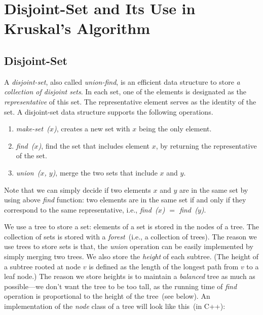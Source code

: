 \section{Disjoint-Set and Its Use in Kruskal's Algorithm}

\subsection*{Disjoint-Set}

A \emph{disjoint-set}, also called \emph{union-find},
is an efficient data structure to store \emph{a collection of disjoint sets}.
In each set, one of the elements is designated as the \emph{representative}
of this set. The representative element serves
as the identity of the set. 
A disjoint-set data structure supports the following operations.
\vspace*{-\topsep}
\begin{enumerate}
\item \emph{make-set~($x$)}, creates a new set with $x$ being the only element.
\item \emph{find~($x$)}, find the set that includes element $x$, by returning the representative of the set.
\item \emph{union~($x$, $y$)}, merge the two sets that include $x$ and $y$.
\end{enumerate}

Note that we can simply decide if two elements $x$ and $y$ are in the same set
by using above \emph{find} function: two elements are in the same set
if and only if they correspond to the same representative, i.e., \emph{find~($x$) $=$ find~($y$)}.

We use a tree to store a set: elements of a set is stored in the nodes of a tree.
The collection of sets is stored with a \emph{forest}~(i.e., a collection of trees).
The reason we use trees to store sets is that, the \emph{union} operation
can be easily implemented by simply merging two trees.
We also store the \emph{height} of each subtree.
(The height of a subtree rooted at node $v$ is defined as the length of the longest path 
from $v$ to a leaf node.) The reason we store heights is to maintain a \emph{balanced} tree
as much as possible---we don't want the tree to be too tall, as the running time
of \emph{find} operation is proportional to the height of the tree~(see below).
An implementation of the \emph{node} class of a tree will look like this~(in C++):

\begin{minipage}{0.8\textwidth}
	\xxx
	\xxx
	\xxx
	\xxx
	\aaa {\};}\xxx
\end{minipage}

